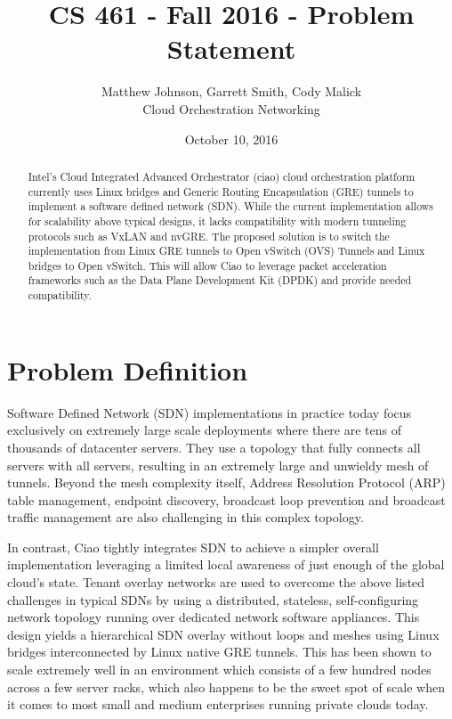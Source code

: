 \documentclass[10pt,letterpaper,onecolumn,draftclsnofoot]{IEEEtran}
\begin{document}
\begin{titlepage}
  \title{CS 461 - Fall 2016 - Problem Statement}
  \author{Matthew Johnson, Garrett Smith, Cody Malick\\Cloud Orchestration Networking}
  \date{October 10, 2016}
  \maketitle
  \vspace{4cm}
  \begin{abstract}
  	\noindent Intel's Cloud Integrated Advanced Orchestrator (ciao) cloud
	orchestration platform currently uses Linux bridges and Generic Routing
	Encapsulation (GRE) tunnels to implement a software defined network
	(SDN). While the current implementation allows for scalability above
	typical designs, it lacks compatibility with modern tunneling protocols
	such as VxLAN and nvGRE. The proposed solution is to switch the
	implementation from Linux GRE tunnels to Open vSwitch (OVS) Tunnels and
	Linux bridges to Open vSwitch. This will allow Ciao to leverage packet
	acceleration frameworks such as the Data Plane Development Kit (DPDK)
	and provide needed compatibility.
  \end{abstract}
\end{titlepage}

\section*{Problem Definition}
Software Defined Network (SDN) implementations in practice today focus exclusively on extremely large scale deployments where there are tens of thousands of datacenter servers. They use a topology that fully connects all servers with all servers, resulting in an extremely large and unwieldy mesh of tunnels. Beyond the mesh complexity itself, Address Resolution Protocol (ARP) table management, endpoint discovery, broadcast loop prevention and broadcast traffic management are also challenging in this complex topology.

In contrast, Ciao tightly integrates SDN to achieve a simpler overall implementation leveraging a limited local awareness of just enough of the global cloud’s state. Tenant overlay networks are used to overcome the above listed challenges in typical SDNs by using a distributed, stateless, self-configuring network topology running over dedicated network software appliances. This design yields a hierarchical SDN overlay without loops and meshes using Linux bridges interconnected by Linux native GRE tunnels. This has been shown to scale extremely well in an environment which consists of a few hundred nodes across a few server racks, which also happens to be the sweet spot of scale when it comes to most small and medium enterprises running private clouds today.
\end{document}
